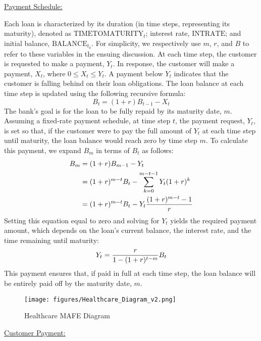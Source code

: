\underline{Payment Schedule:} 

Each loan is characterized by its duration (in time steps, representing its maturity), denoted as $\text{TIMETOMATURITY}_t$; interest rate, $\text{INTRATE}$; and initial balance, $\text{BALANCE}_{t_0}$. For simplicity, we respectively use $m$, $r$, and $B$ to refer to these variables in the ensuing discussion. At each time step, the customer is requested to make a payment, $Y_t$. In response, the customer will make a payment, $X_t$, where $0 \leq X_t \leq Y_t$. A payment below $Y_t$ indicates that the customer is falling behind on their loan obligations. The loan balance at each time step is updated using the following recursive formula:
\begin{equation}
    B_t = (1+r)B_{t-1}-X_t
\end{equation}
The bank’s goal is for the loan to be fully repaid by its maturity date, $m$. Assuming a fixed-rate payment schedule, at time step $t$, the payment request, $Y_t$, is set so that, if the customer were to pay the full amount of $Y_t$ at each time step until maturity, the loan balance would reach zero by time step $m$. To calculate this payment, we expand $B_m$ in terms of $B_t$ as follows:
\begin{align}
    B_{m} &= (1+r)B_{m-1}-Y_t \notag \\
        &= (1+r)^{m-t}B_{t}-\sum_{k=0}^{m-t-1}Y_t(1+r)^k \notag\\
        &= (1+r)^{m-t}B_{t}-Y_t\frac{(1+r)^{m-t}-1}{r} \notag\\
\end{align}
Setting this equation equal to zero and solving for $Y_t$ yields the required payment amount, which depends on the loan’s current balance, the interest rate, and the time remaining until maturity:
\begin{align}
    Y_{t}= \frac{r}{1-(1+r)^{t-m}}B_t \notag
\end{align}
This payment ensures that, if paid in full at each time step, the loan balance will be entirely paid off by the maturity date, $m$.

\begin{figure*}[ht!]
    \centering
    \texttt{[image: figures/Healthcare\_Diagram\_v2.png]}
    \caption{Healthcare MAFE Diagram} 
    \label{fig:Healthcare_Diagram}
    \vspace{-0mm}
\end{figure*}

\underline{Customer Payment:} 

